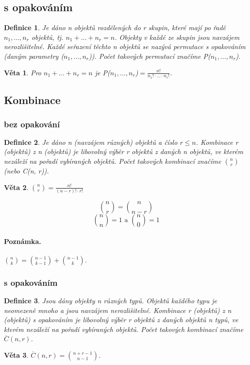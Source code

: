 \documentclass[12pt,a4paper]{article}
\newtheorem{definition}{Definice}
\newtheorem{sentence}{Věta}
\begin{document}
\subsection{s opakováním}
\begin{definition}
	Je dáno n objektů rozdělených do r skupin, které mají po řadě $n_1, \dots,n_r$ objektů, tj. $n_1 + \dots + n_r = n$. Objekty v každé ze skupin jsou navzájem nerozlišitelné. Každé seřazení těchto n objektů se nazývá permutace s opakováním (daným parametry ($n_1, \dots, n_r$)). Počet takových permutací značíme P($n_1, \dots, n_r$).
\end{definition}
\begin{sentence}
	Pro $n_1 + \dots + n_r = n$ je P($n_1, \dots, n_r$)$ = \frac{n!}{n_1! \cdot \dots \cdot n_r!}$.
\end{sentence}

\subsection{Kombinace}
\subsubsection{bez opakování}
\begin{definition}
	Je dáno n (navzájem různých) objektů a číslo $r \leq n$. Kombinace r (objektů) z n (objektů) je libovolný výběr r objektů z daných n objektů, ve kterém nezáleží na pořadí vybíraných objektů. Počet takových kombinací značíme $n \choose r$ (nebo C(n, r)).
\end{definition}
\begin{sentence}
	${n \choose r} = \frac{n!}{(n - r)! \cdot r!}$
\end{sentence}
$$ {n \choose r} = {n \choose n - r} $$
$${n \choose n} = 1 \text{ a } {n \choose 0} = 1 $$
\paragraph{Poznámka.} ${n \choose k} = {n - 1 \choose k - 1} + {n - 1 \choose k}$.

\subsubsection{s opakováním}
\begin{definition}
	Jsou dány objekty n různých typů. Objektů každého typu je neomezeně mnoho a jsou navzájem nerozlišitelné. Kombinace r (objektů) z n (objektů) s opakováním je libovolný výběr r objektů z daných objektů n typů, ve kterém nezáleží na pořadí vybíraných objektů. Počet takových kombinací značíme $\overline{C}(n, r)$.
\end{definition}
\begin{sentence}
	$\overline{C}(n, r) = {n + r - 1 \choose n - 1}$.
\end{sentence}
\end{document}
